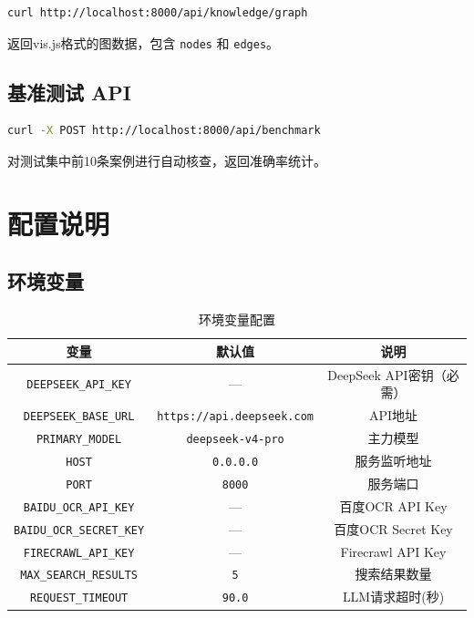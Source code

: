 \documentclass[12pt,a4paper]{ctexart}
\begin{document}
\begin{lstlisting}[language=bash]
curl http://localhost:8000/api/knowledge/graph
\end{lstlisting}

返回vis.js格式的图数据，包含 \texttt{nodes} 和 \texttt{edges}。

\subsection{基准测试 API}

\begin{lstlisting}[language=bash]
curl -X POST http://localhost:8000/api/benchmark
\end{lstlisting}

对测试集中前10条案例进行自动核查，返回准确率统计。

\section{配置说明}

\subsection{环境变量}

\begin{table}[h]
\centering
\begin{tabular}{|c|c|c|}
\hline
\textbf{变量} & \textbf{默认值} & \textbf{说明} \\
\hline
\texttt{DEEPSEEK\_API\_KEY} & — & DeepSeek API密钥（必需） \\
\texttt{DEEPSEEK\_BASE\_URL} & \texttt{https://api.deepseek.com} & API地址 \\
\texttt{PRIMARY\_MODEL} & \texttt{deepseek-v4-pro} & 主力模型 \\
\texttt{HOST} & \texttt{0.0.0.0} & 服务监听地址 \\
\texttt{PORT} & \texttt{8000} & 服务端口 \\
\texttt{BAIDU\_OCR\_API\_KEY} & — & 百度OCR API Key \\
\texttt{BAIDU\_OCR\_SECRET\_KEY} & — & 百度OCR Secret Key \\
\texttt{FIRECRAWL\_API\_KEY} & — & Firecrawl API Key \\
\texttt{MAX\_SEARCH\_RESULTS} & \texttt{5} & 搜索结果数量 \\
\texttt{REQUEST\_TIMEOUT} & \texttt{90.0} & LLM请求超时(秒) \\
\hline
\end{tabular}
\caption{环境变量配置}
\end{table}
\end{document}
